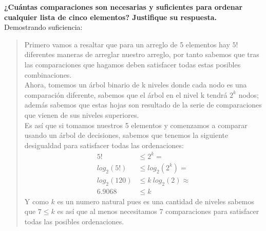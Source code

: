 \textbf{¿Cuántas comparaciones son necesarias y suficientes para ordenar cualquier lista de cinco elementos? Justifique su respuesta.}\\

\textcolor{bibi}{Demostrando suficiencia:}
\begin{quote}
    Primero vamos a resaltar que para un arreglo de 5 elementos hay $5!$ diferentes maneras de arreglar nuestro arreglo, por tanto sabemos que tras las comparaciones que hagamos deben satisfacer todas estas posibles combinaciones. \\
    
    Ahora, tomemos un árbol binario de k niveles donde cada nodo es una comparación diferente, sabemos que el árbol en el nivel k tendrá $2^k$ nodos; además sabemos que estas hojas son resultado de la serie de comparaciones que vienen de sus niveles superiores.\\
    
    Es así que si tomamos nuestros 5 elementos y comenzamos a comparar usando un árbol de decisiones, sabemos que tenemos la siguiente desigualdad para satisfacer todas las ordenaciones:
    \begin{align*}
        5! &\leq 2^k =\\
        log_2(5!) &\leq log_2(2^k) =\\
        log_2(120) &\leq k \ log_2(2) \approx \\
        6.9068 &\leq k 
    \end{align*}
    Y como $k$ es un numero natural pues es una cantidad de niveles sabemos que $7 \leq k$ es así que al menos necesitamos 7 comparaciones para satisfacer todas las posibles ordenaciones.\\
\end{quote}

